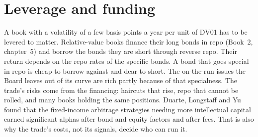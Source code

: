 \begin{omfigure}

\label{fig:s2:government-bond-relative-value:decay}
\end{omfigure}

\section{Leverage and funding}

A book with a volatility of a few basis points a year per unit of DV01 has to be levered to matter. Relative-value books finance their long bonds in
repo (Book~2, chapter~5) and borrow the bonds they are short through reverse repo. Their return depends on the repo rates of the specific bonds. A bond
that goes special in repo is cheap to borrow against and dear to short. The on-the-run issues the Board leaves out of its curve are rich partly
because of that specialness. The trade's risks come from the financing: haircuts that rise, repo that cannot be rolled, and many books holding the same
positions. Duarte, Longstaff and Yu found that the fixed-income arbitrage strategies needing more intellectual capital earned significant alphas after
bond and equity factors and after fees. That is also why the trade's costs, not its signals, decide who can run it.

